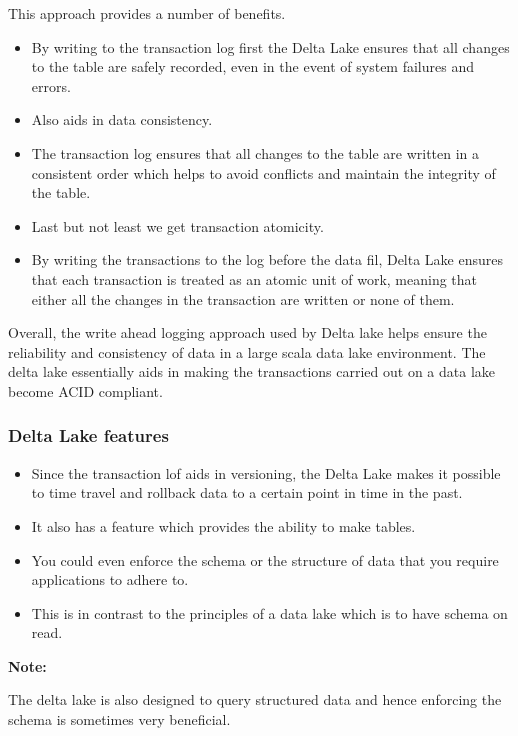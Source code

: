 \documentclass[a4paper, 11pt]{book}
\newenvironment{note}{
    \begin{siderule}
        \textbf{Note: }
        }{
    \end{siderule}}
\begin{document}
    This approach provides a number of benefits.
    \begin{itemize}
        \item By writing to the transaction log first the Delta Lake ensures that all changes to the table are safely recorded, even in the event of system failures and errors.
        \item Also aids in data consistency.
        \item The transaction log ensures that all changes to the table are written in a consistent order which helps to avoid conflicts and maintain the integrity of the table.
        \item Last but not least we get transaction atomicity.
        \item By writing the transactions to the log before the data fil, Delta Lake ensures that each transaction is treated as an atomic unit of work, meaning that either all the changes in the transaction are written or none of them.
    \end{itemize}

    Overall, the write ahead logging approach used by Delta lake helps ensure the reliability and consistency of data in a large scala data lake environment.
    The delta lake essentially aids in making the transactions carried out on a data lake become ACID compliant.

    \subsubsection{Delta Lake features}
    \begin{itemize}
        \item Since the transaction lof aids in versioning, the Delta Lake makes it possible to time travel and rollback data to a certain point in time in the past.
        \item It also has a feature which provides the ability to make tables.
        \item You could even enforce the schema or the structure of data that you require applications to adhere to.
        \item This is in contrast to the principles of a data lake which is to have schema on read.
    \end{itemize}

    \begin{note}
        The delta lake is also designed to query structured data and hence enforcing the schema is sometimes very beneficial.
    \end{note}
\end{document}
